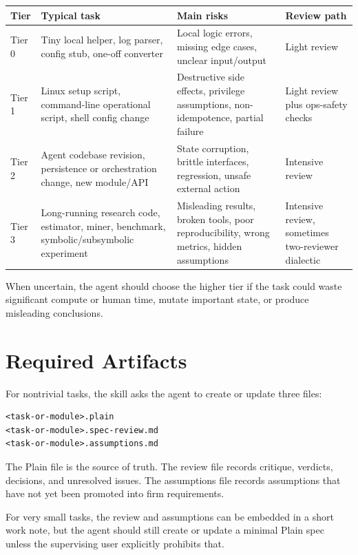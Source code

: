 \documentclass[11pt]{article}
\begin{document}
\begin{longtable}{|p{}|p{}|p{}|p{}|}
\hline
\textbf{Tier} & \textbf{Typical task} & \textbf{Main risks} & \textbf{Review path} \\
\hline
Tier 0 & Tiny local helper, log parser, config stub, one-off converter & Local logic errors, missing edge cases, unclear input/output & Light review \\
\hline
Tier 1 & Linux setup script, command-line operational script, shell config change & Destructive side effects, privilege assumptions, non-idempotence, partial failure & Light review plus ops-safety checks \\
\hline
Tier 2 & Agent codebase revision, persistence or orchestration change, new module/API & State corruption, brittle interfaces, regression, unsafe external action & Intensive review \\
\hline
Tier 3 & Long-running research code, estimator, miner, benchmark, symbolic/subsymbolic experiment & Misleading results, broken tools, poor reproducibility, wrong metrics, hidden assumptions & Intensive review, sometimes two-reviewer dialectic \\
\hline
\end{longtable}

When uncertain, the agent should choose the higher tier if the task could waste
significant compute or human time, mutate important state, or produce misleading
conclusions.

\section{Required Artifacts}

For nontrivial tasks, the skill asks the agent to create or update three files:

\begin{lstlisting}
<task-or-module>.plain
<task-or-module>.spec-review.md
<task-or-module>.assumptions.md
\end{lstlisting}

The Plain file is the source of truth. The review file records critique,
verdicts, decisions, and unresolved issues. The assumptions file records
assumptions that have not yet been promoted into firm requirements.

For very small tasks, the review and assumptions can be embedded in a short work
note, but the agent should still create or update a minimal Plain spec unless the
supervising user explicitly prohibits that.
\end{document}

